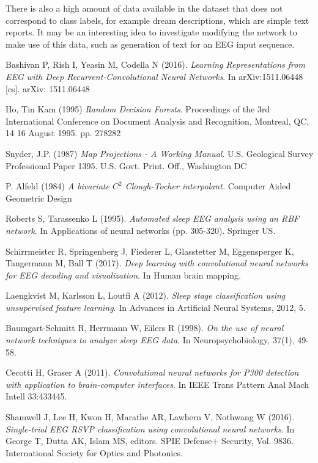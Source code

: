\documentclass{article}
\begin{document}
There is also a high amount of data available in the dataset that does not correspond to class labels, for example dream descriptions, which are simple text reports. It may be an interesting idea to investigate modifying the network to make use of this data, such as generation of text for an EEG input sequence.
\begin{thebibliography}{99}

	Bashivan  P,  Rish  I,  Yeasin  M,  Codella  N  (2016). 
	\textit{Learning  Representations from  EEG with  Deep Recurrent-Convolutional  Neural Networks}. 
	In arXiv:1511.06448 [cs]. arXiv: 1511.06448

	Ho, Tin Kam (1995)
	\textit{Random Decision Forests}. 
	Proceedings of the 3rd International Conference on Document Analysis and Recognition, Montreal, QC, 14		16 August 1995. pp. 278282

	Snyder, J.P. (1987) 
	\textit{Map Projections - A Working Manual}. 
	U.S. Geological Survey Professional Paper 1395. U.S. Govt. Print.
	Off., Washington DC
	
	P. Alfeld (1984)
	\textit{A bivariate $C^2$ Clough-Tocher interpolant.} 
	Computer Aided Geometric Design

	Roberts S, Tarassenko L (1995).
	\textit{Automated sleep EEG analysis using an RBF network}.
	In Applications of neural networks (pp. 305-320). Springer US.

	Schirrmeister R, Springenberg J, Fiederer L, Glasstetter M, Eggensperger K, Tangermann M, Ball T (2017). 
	\textit{Deep learning with convolutional neural networks for EEG decoding and visualization}.
	In Human brain mapping.

	Laengkvist M, Karlsson L, Loutfi A (2012).
	\textit{Sleep stage classification using unsupervised feature learning}.
	In Advances in Artificial Neural Systems, 2012, 5.

	Baumgart-Schmitt R, Herrmann W, Eilers R (1998). 
	\textit{On the use of neural network techniques to analyze sleep EEG data}.
	In Neuropsychobiology, 37(1), 49-58.

	Cecotti H, Graser A (2011).
	\textit{Convolutional neural networks for P300 detection with application to brain-computer interfaces}. 
	In IEEE Trans Pattern Anal Mach Intell 33:433445.

	Shamwell J, Lee H, Kwon H, Marathe AR, Lawhern V, Nothwang W (2016).
	\textit{Single-trial EEG RSVP classification using convolutional neural networks}. 
	In George T, Dutta AK, Islam MS, editors. SPIE Defense+ Security, Vol. 9836. International Society for Optics and Photonics.


\end{thebibliography}
\end{document}
